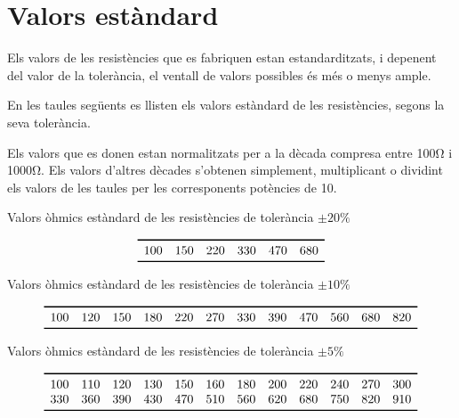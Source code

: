 \section{Valors est\`{a}ndard} 

Els valors de les resist\`{e}ncies que es fabriquen estan estandarditzats, i depenent
del valor de la toler\`{a}ncia, el ventall de valors possibles \'{e}s m\'{e}s o menys ample.

En les taules seg\"{u}ents es llisten els valors est\`{a}ndard de les resist\`{e}ncies, segons la seva
toler\`{a}ncia.

Els valors que es donen estan normalitzats per a la d\`{e}cada compresa
entre 100\unit{\ohm} i 1000\unit{\ohm}. Els valors d'altres d\`{e}cades
s'obtenen simplement, multiplicant o dividint els valors de les
taules per les corresponents  pot\`{e}ncies de 10.

\begin{table}[htb]
   \caption{Valors \`{o}hmics est\`{a}ndard de les resist\`{e}ncies de toler\`{a}ncia $\pm20\unit{\%}$}
   \[ \begin{array}{cccccc}
   \toprule[1pt]
   100 & 150 & 220 & 330 & 470 &  680  \\
   \bottomrule[1pt]
   \end{array}   \]
\end{table}

\begin{table}[htb]
   \caption{Valors \`{o}hmics est\`{a}ndard de les resist\`{e}ncies de toler\`{a}ncia $\pm10\unit{\%}$}
   \[ \begin{array}{cccccccccccc}
   \toprule[1pt]
   100 & 120 & 150 & 180 & 220 & 270 & 330 & 390 & 470 & 560 & 680 & 820 \\
   \bottomrule[1pt]
   \end{array}   \]
\end{table}

\begin{table}[htb]
   \caption{Valors \`{o}hmics est\`{a}ndard de les resist\`{e}ncies de toler\`{a}ncia $\pm5\unit{\%}$}
   \[ \begin{array}{cccccccccccc}
   \toprule[1pt]
   100 & 110 & 120 & 130 & 150 & 160 & 180 & 200 & 220 & 240 & 270 & 300 \\
   330 & 360 & 390 & 430 & 470 & 510 & 560 & 620 & 680 & 750 & 820 & 910 \\
   \bottomrule[1pt]
   \end{array}   \]
\end{table}

